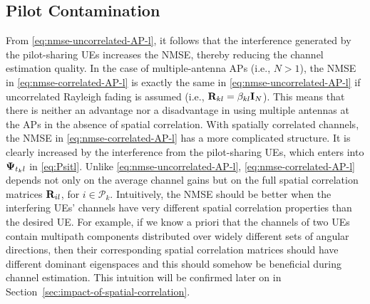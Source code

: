 \subsection{Pilot Contamination}

From \eqref{eq:nmse-uncorrelated-AP-l}, it follows that the interference generated by the pilot-sharing UEs increases the NMSE, thereby reducing the channel estimation quality. In the case of multiple-antenna APs (i.e., $N > 1$), the NMSE in \eqref{eq:nmse-correlated-AP-l} is exactly the same in \eqref{eq:nmse-uncorrelated-AP-l} if uncorrelated Rayleigh fading is assumed (i.e., $\mathbf{R}_{kl}=\beta_{kl}\mathbf{I}_{N}$). This means that there is neither an advantage nor a disadvantage in using multiple antennas at the APs in the absence of spatial correlation. With spatially correlated channels, the NMSE in \eqref{eq:nmse-correlated-AP-l} has a more complicated structure. It is clearly increased by the interference from the pilot-sharing UEs, which enters into $\mathbf{\Psi}_{t_kl}$ in \eqref{eq:Psitl}. Unlike \eqref{eq:nmse-uncorrelated-AP-l}, \eqref{eq:nmse-correlated-AP-l} depends not only on the average channel gains but on the full spatial correlation matrices $\mathbf{R}_{il}$, for $i\in \mathcal{P}_k$. Intuitively, the NMSE should be better when the interfering UEs' channels have very different spatial correlation properties than the desired UE. For example, if we know a priori that the channels of two UEs contain multipath components distributed over widely different sets of angular directions, then their corresponding spatial correlation matrices should have different dominant eigenspaces and this should somehow be beneficial during channel estimation.
This intuition will be confirmed later on in Section~\ref{sec:impact-of-spatial-correlation}. 

